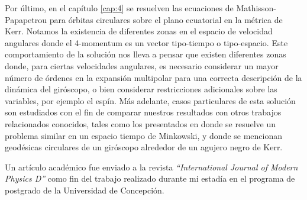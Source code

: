 Por último, en el capítulo \ref{cap:4} se resuelven las ecuaciones de Mathisson-Papapetrou para órbitas circulares sobre el plano ecuatorial en la métrica de Kerr. Notamos la existencia de diferentes zonas en el espacio de velocidad angulares donde el 4-momentum es un vector tipo-tiempo o tipo-espacio. Este comportamiento de la solución nos lleva a pensar que existen diferentes zonas donde, para ciertas velocidades angulares, es necesario considerar un mayor número de órdenes en la expansión multipolar para una correcta descripción de la dinámica del giróscopo, o bien considerar restricciones adicionales sobre las variables, por ejemplo el espín. Más adelante, casos particulares de esta solución son estudiados con el fin de comparar nuestros resultados con otros trabajos relacionados conocidos, tales como los presentados en \cite{Costa-Herdeiro-Natario-Zilhao} donde se resuelve un problema similar en un espacio tiempo de Minkowski, y \cite{Costa-Natario-Zilhao} donde se mencionan geodésicas circulares de un giróscopo alrededor de un agujero negro de Kerr.

Un artículo académico fue enviado a la revista \textit{``International Journal of Modern Physics D''} como fin del trabajo realizado durante mi estadía en el programa de postgrado de la Universidad de Concepción.